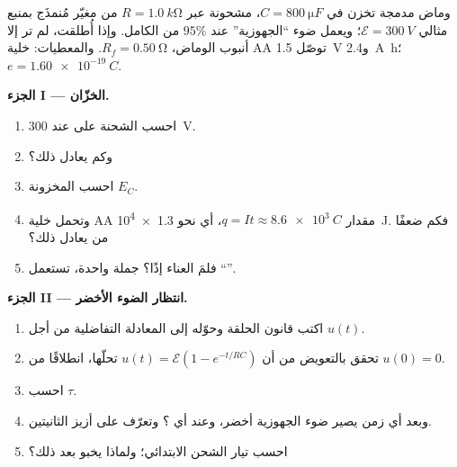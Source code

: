 \begin{problem}
\label{pb:g12:rc-rl-circuits:1}
 وماض مدمجة تخزن  في 
$C = \qty{800}{\micro F}$، مشحونة عبر $R = \qty{1.0}{k\ohm}$ من
مغيّر مُنمذَج بمنبع مثالي $\mathcal{E} = \qty{300}{V}$؛
ويعمل ضوء ``الجهوزية'' عند $95\%$ من  الكامل. وإذا أُطلقت، لم تر
 إلا أنبوب الوماض، $R_f = \qty{0.50}{\ohm}$. والمعطيات: خلية
AA توصّل \qty{1.5}{V} و\qty{2.4}{A.h}؛ $e = \qty{1.60e-19}{C}$.

\medskip
\noindent\textbf{الجزء I --- الخزّان.}
\begin{enumerate}
  \item احسب الشحنة على  عند \qty{300}{V}.
  \item وكم  يعادل ذلك؟
  \item احسب  المخزونة $E_C$.
  \item وتحمل خلية AA مقدار $q = It \approx \qty{8.6e3}{C}$، أي نحو
        \qty{1.3e4}{J}. فكم ضعفًا من   يعادل ذلك؟
  \item فلمَ العناء  إذًا؟ جملة واحدة، تستعمل ``''.
\end{enumerate}

\medskip
\noindent\textbf{الجزء II --- انتظار الضوء الأخضر.}
\begin{enumerate}[resume]
  \item اكتب قانون الحلقة وحوّله إلى المعادلة التفاضلية
        من أجل $u(t)$.
  \item تحقق بالتعويض من أن $u(t) = \mathcal{E}(1 - e^{-t/RC})$
        تحلّها، انطلاقًا من $u(0) = 0$.
  \item احسب  $\tau$.
  \item وبعد أي زمن يصير ضوء الجهوزية أخضر، وعند أي
        ؟ وتعرّف على أزيز الثانيتين.
  \item احسب تيار الشحن الابتدائي؛ ولماذا يخبو بعد ذلك؟
\end{enumerate}


\end{problem}
